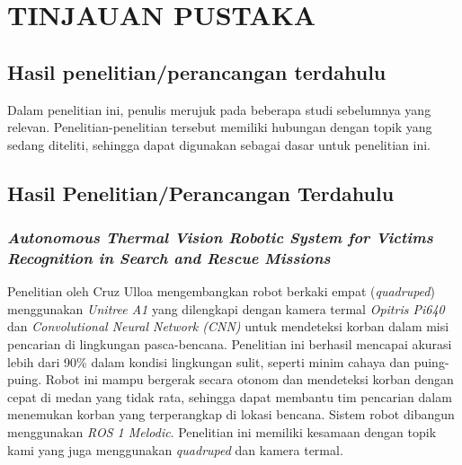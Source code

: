 \chapter{TINJAUAN PUSTAKA}

\section{Hasil penelitian/perancangan terdahulu}
Dalam penelitian ini, penulis merujuk pada beberapa studi sebelumnya yang relevan. Penelitian-penelitian tersebut memiliki hubungan dengan topik yang sedang diteliti, sehingga dapat digunakan sebagai dasar untuk penelitian ini.

\section{Hasil Penelitian/Perancangan Terdahulu}



\subsection{\emph{Autonomous Thermal Vision Robotic System for Victims Recognition in Search and Rescue Missions}}

Penelitian oleh Cruz Ulloa mengembangkan robot berkaki empat (\emph{quadruped}) menggunakan \emph{Unitree A1} yang dilengkapi dengan kamera termal \emph{Opitris Pi640} dan \emph{Convolutional Neural Network (CNN)} untuk mendeteksi korban dalam misi pencarian di lingkungan pasca-bencana. Penelitian ini berhasil mencapai akurasi lebih dari 90\% dalam kondisi lingkungan sulit, seperti minim cahaya dan puing-puing. Robot ini mampu bergerak secara otonom dan mendeteksi korban dengan cepat di medan yang tidak rata, sehingga dapat membantu tim pencarian dalam menemukan korban yang terperangkap di lokasi bencana\cite{Cruz2021}. Sistem robot dibangun menggunakan \emph{ROS 1 Melodic}. Penelitian ini memiliki kesamaan dengan topik kami yang juga menggunakan \emph{quadruped} dan kamera termal.

